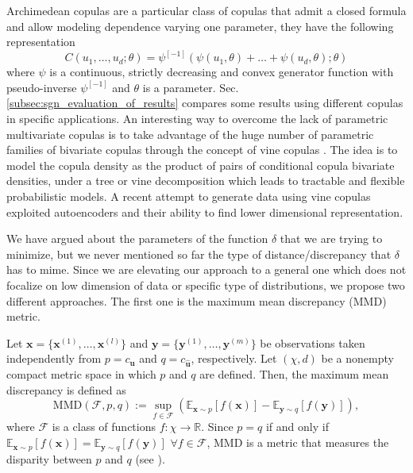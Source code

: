 Archimedean copulas are a particular class of copulas that admit a closed formula and allow modeling dependence varying one parameter, they have the following representation
\begin{equation}
C(u_1,\dots, u_d; \theta) = \psi^{[-1]}(\psi(u_1,\theta)+\dots+\psi(u_d,\theta); \theta)
\end{equation}
where $\psi$ is a continuous, strictly decreasing and convex generator function with pseudo-inverse $\psi^{[-1]}$ \cite{Nelsen2006} and $\theta$ is a parameter. 
Sec. \ref{subsec:sgn_evaluation_of_results} compares some results using different copulas in specific applications.
An interesting way to overcome the lack of parametric multivariate copulas is to take advantage of the huge number of parametric families of bivariate copulas through the concept of vine copulas \cite{VineCopula, Bedford2016}. The idea is to model the copula density as the product of pairs of conditional copula bivariate densities, under a tree or vine decomposition which leads to tractable and flexible probabilistic models. A recent attempt to generate data using vine copulas \cite{VCAE} exploited autoencoders and their ability to find lower dimensional representation.

We have argued about the parameters of the function $\delta$ that we are trying to minimize, but we never mentioned so far the type of distance/discrepancy that $\delta$ has to mime. Since we are elevating our approach to a general one which does not focalize on low dimension of data or specific type of distributions, we propose two different approaches. The first one is the maximum mean discrepancy (MMD) metric.

Let $\mathbf{x}=\{\mathbf{x}^{(1)},\dots,\mathbf{x}^{(l)}\}$ and $\mathbf{y}=\{\mathbf{y}^{(1)},\dots,\mathbf{y}^{(m)}\}$ be observations taken independently from $p = c_{\mathbf{u}}$ and $q = c_{\mathbf{\hat{u}}}$, respectively. Let $(\chi,d)$ be a nonempty compact metric space in which $p$ and $q$ are defined. Then, the maximum mean discrepancy is defined as
\begin{equation}
\text{MMD}(\mathcal{F},p,q) := \sup_{f\in \mathcal{F}}(\mathbb{E}_{\mathbf{x}\sim p}[f(\mathbf{x})]-\mathbb{E}_{\mathbf{y}\sim q}[f(\mathbf{y})]),
\label{eq:sgn_MMD}
\end{equation}
where $\mathcal{F}$ is a class of functions $f:\chi \rightarrow \mathbb{R}$. 
Since $p=q$ if and only if $\mathbb{E}_{\mathbf{x}\sim p}[f(\mathbf{x})]=\mathbb{E}_{\mathbf{y}\sim q}[f(\mathbf{y})]$ $\forall f\in \mathcal{F}$, MMD is a metric that measures the disparity between $p$ and $q$ (see \cite{FortetMMD}).

